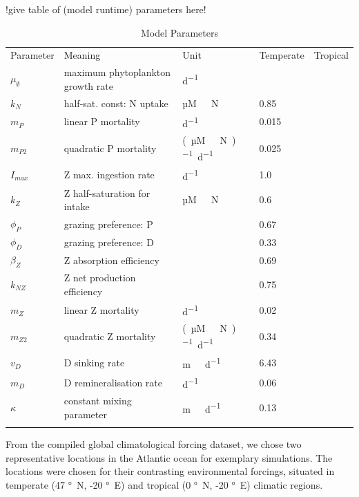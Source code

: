 \documentclass[template.tex]{subfiles}
\begin{document}

!give table of (model runtime) parameters here!\\


\begin{table}[t]
\caption{Model Parameters}
\begin{tabular}{l l l l l}
Parameter & Meaning & Unit & Temperate & Tropical \\
\tophline

$\mu_{\emptyset}$ & maximum phytoplankton growth rate  & \unit{d^{-1}} & & \\
$k_N$ & half-sat. const: N uptake & \unit{µM \ N} & 0.85 & \\
$m_P$ & linear P mortality & \unit{d^{−1}} & 0.015 & \\
$m_{P2}$ & quadratic P mortality & \unit{(µM \ N)^{-1} d^{−1}} & 0.025 & \\
$I_{max}$ & Z max. ingestion rate & \unit{d^{−1}} & 1.0 & \\
$k_Z$ & Z half-saturation for intake & \unit{µM \ N} & 0.6 & \\
$\phi_P$ & grazing preference: P & & 0.67 & \\
$\phi_D$ & grazing preference: D & & 0.33 & \\
$\beta_Z$ & Z absorption efficiency & & 0.69 & \\
$k_{NZ}$ & Z net production efficiency & & 0.75 &  \\
$m_Z$ & linear Z mortality  & \unit{d^{−1}} & 0.02 & \\
$m_{Z2}$ & quadratic Z mortality & \unit{(µM \ N)^{-1} d^{−1}} & 0.34 & \\
$v_D$ & D sinking rate & \unit{m \ d^{−1}} & 6.43 & \\
$m_D$ & D remineralisation rate & \unit{d^{−1}} & 0.06 & \\
$\kappa$ & constant mixing parameter & \unit{m \ d^{−1}} & 0.13 & \\
\middlehline

\bottomhline
\end{tabular}
\label{Table:UseCase1Parameters}
\end{table}
%


From the compiled global climatological forcing dataset, we chose two representative locations in the Atlantic ocean for exemplary simulations. The locations were chosen for their contrasting environmental forcings, situated in temperate (47 \unit{\degree N}, -20 \unit{\degree E}) and tropical (0 \unit{\degree N}, -20 \unit{\degree E}) climatic regions. 
\end{document}
